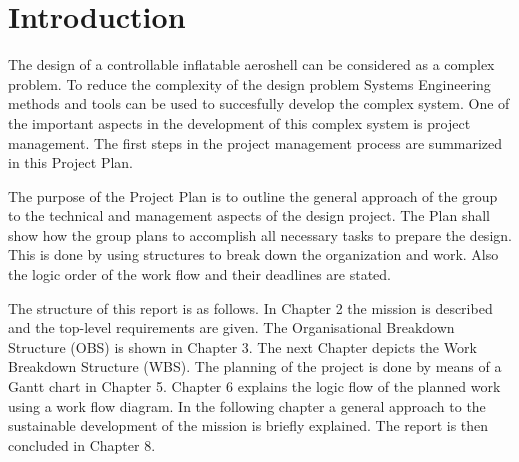 \section{Introduction}\label{cha:introduction}
The design of a controllable inflatable aeroshell can be considered as a complex problem. To reduce the complexity of the design problem Systems Engineering methods and tools can be used to succesfully develop the complex system. One of the important aspects in the development of this complex system is project management. The first steps in the project management process are summarized in this Project Plan.

The purpose of the Project Plan is to outline the general approach of the group to the technical and management aspects of the design project. The Plan shall show how the group plans to accomplish all necessary tasks to prepare the design. This is done by using structures to break down the organization and work. Also the logic order of the work flow and their deadlines are stated.

The structure of this report is as follows. In Chapter 2 the mission is described and the top-level requirements are given. The Organisational Breakdown Structure (OBS) is shown in Chapter 3. The next Chapter depicts the Work Breakdown Structure (WBS). The planning of the project is done by means of a Gantt chart in Chapter 5. Chapter 6 explains the logic flow of the planned work using a work flow diagram. In the following chapter a general approach to the sustainable development of the mission is briefly explained. The report is then concluded in Chapter 8.
